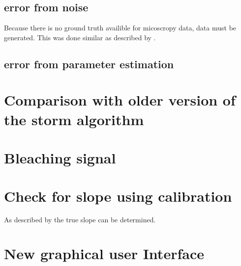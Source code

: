 \subsection{error from noise}
Because there is no ground truth availible for micoscropy data, data must be
generated. This was done similar as described by \cite{simulated}.
\subsection{error from parameter estimation}

\section{Comparison with older version of the storm algorithm}
\section{Bleaching signal}

\section{Check for slope using calibration}
As described by \cite{meanVar} the true slope can be determined.

\section{New graphical user Interface}